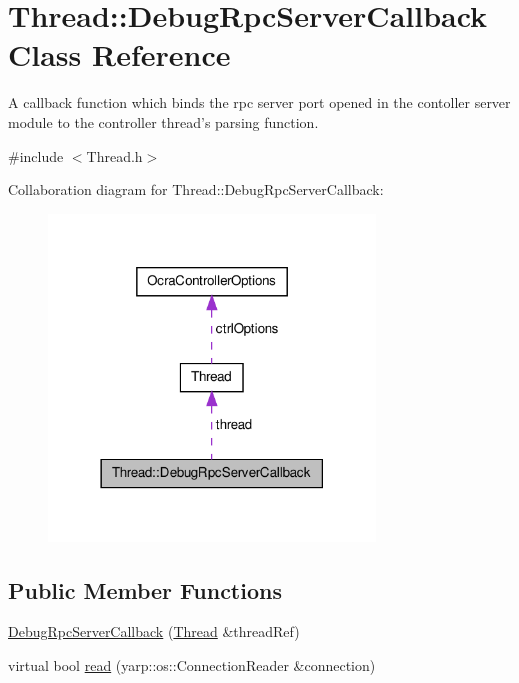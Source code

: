 \hypertarget{classThread_1_1DebugRpcServerCallback}{\section{\-Thread\-:\-:\-Debug\-Rpc\-Server\-Callback \-Class \-Reference}
\label{classThread_1_1DebugRpcServerCallback}
}


\-A callback function which binds the rpc server port opened in the contoller server module to the controller thread's parsing function.  




{\ttfamily \#include $<$\-Thread.\-h$>$}



\-Collaboration diagram for \-Thread\-:\-:\-Debug\-Rpc\-Server\-Callback\-:\nopagebreak
\begin{figure}[H]
\begin{center}
\leavevmode
\includegraphics[width=246pt]{classThread_1_1DebugRpcServerCallback__coll__graph}
\end{center}
\end{figure}
\subsection*{\-Public \-Member \-Functions}
\begin{DoxyCompactItemize}
\item 
\hyperlink{classThread_1_1DebugRpcServerCallback_a479142cdf2f840df23b4605a532aaddf}{\-Debug\-Rpc\-Server\-Callback} (\hyperlink{classThread}{\-Thread} \&thread\-Ref)
\item 
virtual bool \hyperlink{classThread_1_1DebugRpcServerCallback_a3b39ac9b379ce3212bb2b05a89fa6024}{read} (yarp\-::os\-::\-Connection\-Reader \&connection)
\end{DoxyCompactItemize}
